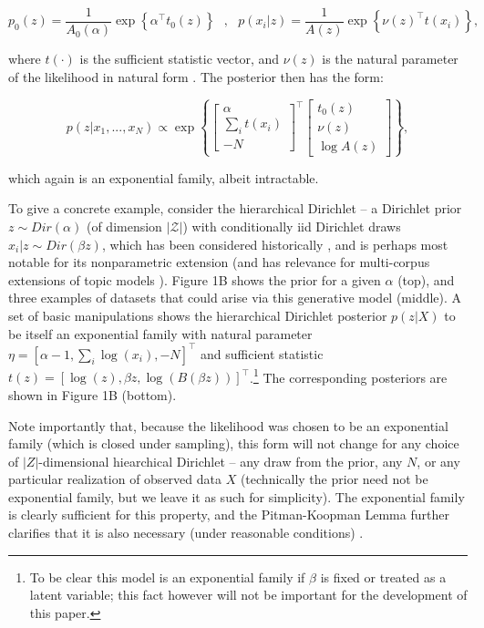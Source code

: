 \documentclass{article}
\begin{document}
$$ p_0(z) = \frac{1}{A_0(\alpha)} \exp\left\{ \alpha^\top t_0(z) \right \} ~~~ , ~~~ p(x_i|z) = \frac{1}{A(z)} \exp\left\{ \nu(z)^\top t(x_i) \right \},$$

where $t(\cdot)$ is the sufficient statistic vector, and $\nu(z)$ is the natural parameter of the likelihood in natural form \cite{robert2007bayesian}.   The posterior then has the form:

\begin{equation}
  p(z | x_1,...,x_N)  \propto  \exp\left\{ \begin{bmatrix} \alpha \\ \sum_i t(x_i) \\ -N \end{bmatrix}^\top\begin{bmatrix} t_0(z) \\ \nu(z) \\ \log A(z) \end{bmatrix} \right\},
\label{eq:1}
\end{equation}

which again is an exponential family, albeit intractable.

To give a concrete example, consider the hierarchical Dirichlet -- a Dirichlet prior $z\sim Dir(\alpha)$ (of dimension $|\mathcal{Z}|$) with conditionally iid Dirichlet draws $x_i | z \sim Dir(\beta z)$, which has been considered historically \cite{mackay1995hierarchical}, and is perhaps most notable for its nonparametric extension \cite{teh2006hdp} (and has relevance for multi-corpus extensions of topic models \cite{blei2003latent, pritchard2000inference}).  
Figure 1B shows the prior for a given $\alpha$ (top), and three examples of datasets that could arise via this generative model (middle).  
A set of basic manipulations shows the hierarchical Dirichlet posterior $p(z|X)$ to be itself an exponential family with natural parameter $\eta = \left[ \alpha -1 , \sum_i \log(x_i) , -N \right]^\top$ and sufficient statistic $t(z) = \left[ \log(z), \beta z , \log(B(\beta z)) \right]^\top$.\footnote{To be clear this model is an exponential family if $\beta$ is fixed or treated as a latent variable; this fact however will not be important for the development of this paper.}
The corresponding posteriors are shown in Figure 1B (bottom).  

Note importantly that, because the likelihood was chosen to be an exponential family (which is closed under sampling), this form will not change for any choice of $|Z|$-dimensional hiearchical Dirichlet -- any draw from the prior, any $N$, or any particular realization of observed data $X$ (technically the prior need not be exponential family, but we leave it as such for simplicity).  
The exponential family is clearly sufficient for this property, and the Pitman-Koopman Lemma further clarifies that it is also necessary (under reasonable conditions) \cite[\S3.3.3]{robert2007bayesian}.
\end{document}
